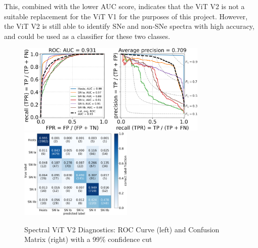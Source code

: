 This, combined with the lower AUC score, indicates that the ViT V2 is not a suitable 
replacement for the ViT V1 for the purposes of this project. However, the ViT V2
is still able to identify SNe and non-SNe spectra with high accuracy, and could
be used as a classifier for these two classes. 

\begin{figure}[h]
    \centering
    \includegraphics[height=4.3cm]{figures/v2_real/vit_model_V2roc99_e26.png}
    \quad
    \includegraphics[height=4.3cm]{figures/v2_real/vit_model_V2cm99_e26.png}
    \caption{Spectral ViT V2 Diagnostics: ROC Curve (left) and Confusion Matrix (right) with a 99\% confidence
    cut\label{fig:v2_99_qual}}
\end{figure}



\clearpage
